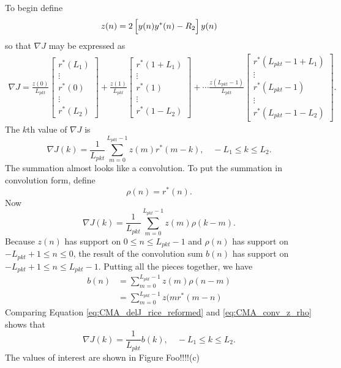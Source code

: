 To begin define
\begin{equation}
z(n) = 	2\left[ \vphantom{\displaystyle\sum}  y(n) y^\ast(n) - R_2 \right] y(n)
\end{equation} 
so that $\nabla J$ may be expressed as
\begin{multline}
\nabla J
	= 
	\frac{z(0)}{L_{pkt}}
		\begin{bmatrix} r^\ast(L_1) \\ \vdots \\ r^\ast(0) \\ \vdots \\ r^\ast(L_2) \end{bmatrix} +
	\frac{z(1)}{L_{pkt}}
		\begin{bmatrix} r^\ast(1+L_1) \\ \vdots \\ r^\ast(1) \\ \vdots \\ r^\ast(1-L_2) \end{bmatrix} + \cdots
	\frac{z(L_{pkt}-1)}{L_{pkt}}
		\begin{bmatrix} r^\ast(L_{pkt}-1+L_1) \\ \vdots \\ r^\ast(L_{pkt}-1) \\ \vdots \\ r^\ast(L_{pkt}-1-L_2) \end{bmatrix}
\label{eq:delJ_writeoutr}.
\end{multline}
The $k$th value of $\nabla J$ is
\begin{equation}
\nabla J(k) = \frac{1}{L_{pkt}} \sum^{L_{pkt}-1}_{m=0}  z(m) r^\ast(m-k), \quad -L_1 \leq k \leq L_2.
\end{equation}
The summation almost looks like a convolution.
To put the summation in convolution form, define
\begin{equation}
\rho(n) = r^\ast(n).
\end{equation}
Now
\begin{equation}
\nabla J(k) = \frac{1}{L_{pkt}} \sum^{L_{pkt}-1}_{m=0}  z(m) \rho(k-m).
\label{eq:CMA_delJ_rice_reformed}
\end{equation}
Because $z(n)$ has support on $0 \leq n \leq L_{pkt}-1$ and $\rho(n)$ has support on $-L_{pkt}+1 \leq n \leq 0$, 
the result of the convolution sum $b(n)$ has support on $-L_{pkt}+1 \leq n \leq L_{pkt}-1$.
Putting all the pieces together, we have
\begin{align}
b(n) &= \sum^{L_{pkt}-1}_{m=0} z(m) \rho(n-m) \nonumber \\
	 &= \sum^{L_{pkt}-1}_{m=0} z(mr^\ast(m-n)
	 \label{eq:CMA_conv_z_rho}
\end{align}
Comparing Equation \eqref{eq:CMA_delJ_rice_reformed} and \eqref{eq:CMA_conv_z_rho} shows that 
\begin{equation}
\nabla J(k) = \frac{1}{L_{pkt}} b(k), \quad -L_1 \leq k \leq L_2.
\label{eq:CMA_delJ_donzo}
\end{equation}
The values of interest are shown in Figure Foo!!!!(c)

